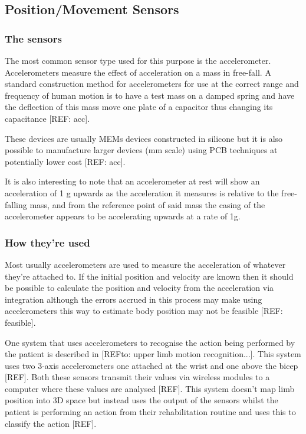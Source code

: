 \documentclass[journal]{IEEEtran}
\begin{document}
\subsection{Position/Movement Sensors}
\subsubsection{The sensors}
The most common sensor type used for this purpose is the accelerometer. Accelerometers measure 
the effect of acceleration on a mass in free-fall. A standard construction method for accelerometers 
for use at the correct range and frequency of human motion is to have a test mass on a damped spring 
and have the deflection of this mass move one plate of a capacitor thus changing its capacitance [REF: acc].

These devices are usually MEMs devices constructed in silicone but it is also possible to manufacture 
larger devices (mm scale) using PCB techniques at potentially lower cost [REF: acc].

It is also interesting to note that an accelerometer at rest will show an acceleration of 1 g upwards as 
the acceleration it measures is relative to the free-falling mass, and from the reference point of said 
mass the casing of the accelerometer appears to be accelerating upwards at a rate of 1g.

\subsubsection{How they're used}
Most usually accelerometers are used to measure the acceleration of whatever they're attached to. 
If the initial position and velocity are known then it should be possible to calculate the position and velocity 
from the acceleration via integration although the errors accrued in this process may make using accelerometers 
this way to estimate body position may not be feasible [REF: feasible].

One system that uses accelerometers to recognise the action being performed by the patient 
is described in [REFto: upper limb motion recognition...]. This system uses two 3-axis accelerometers 
one attached at the wrist and one above the bicep [REF]. Both these sensors transmit their 
values via wireless modules to a computer where these values are analysed [REF]. This system 
doesn't map limb position into 3D space but instead uses the output of the sensors whilst the 
patient is performing an action from their rehabilitation routine and uses this to classify the 
action [REF].
\end{document}

